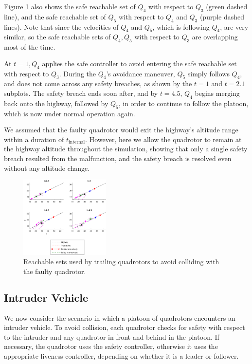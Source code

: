 Figure \ref{fig:faulty2} also shows the safe reachable set of $Q_4$ with respect to $Q_3$ (green dashed line), and the safe reachable set of $Q_5$ with respect to $Q_4$ and $Q_3$ (purple dashed lines). Note that since the velocities of $Q_4$ and $Q_5$, which is following $Q_4$, are very similar, so the safe reachable sets of $Q_4,Q_5$ with respect to $Q_3$ are overlapping most of the time. 

At $t=1,Q_4$ applies the safe controller to avoid entering the safe reachable set with respect to $Q_3$. During the $Q_4$'s avoidance maneuver, $Q_5$ simply follows $Q_4$, and does not come across any safety breaches, as shown by the $t=1$ and $t=2.1$ subplots. The safety breach ends soon after, and by $t=4.5$, $Q_4$ begins merging back onto the highway, followed by $Q_5$, in order to continue to follow the platoon, which is now under normal operation again.

We assumed that the faulty quadrotor would exit the highway's altitude range within a duration of $t_\text{internal}$. However, here we allow the quadrotor to remain at the highway altitude throughout the simulation, showing that only a single safety breach resulted from the malfunction, and the safety breach is resolved even without any altitude change.


\begin{figure}
	\center
		\includegraphics[width=0.4\textwidth]{faultyRsets}
		\caption{Reachable sets used by trailing quadrotors to avoid colliding with the faulty quadrotor.}
		\label{fig:faulty2}
\end{figure}

\subsection{Intruder Vehicle}
We now consider the scenario in which a platoon of quadrotors encounters an intruder vehicle. To avoid collision, each quadrotor checks for safety with respect to the intruder and any quadrotor in front and behind in the platoon. If necessary, the quadrotor uses the safety controller, otherwise it uses the appropriate liveness controller, depending on whether it is a leader or follower.

